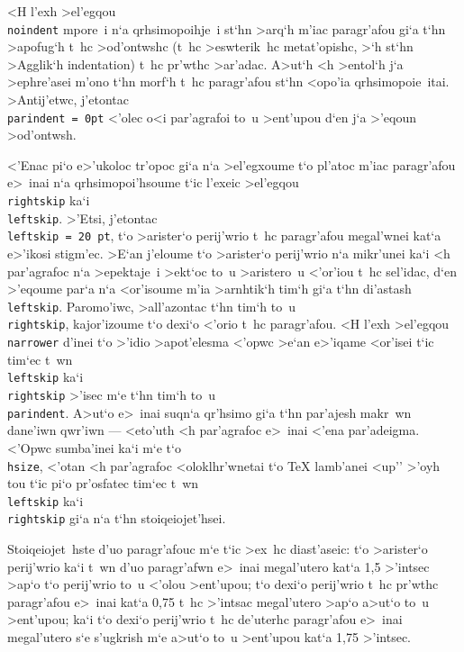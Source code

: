 <H l'exh >el'egqou {\tt \\noindent} mpore~i n`a qrhsimopoihje~i st`hn
>arq`h m'iac paragr'afou gi`a t`hn >apofug`h t~hc {\tengs >od'ontwshc}
(t~hc >eswterik~hc metat'opishc, >`h st`hn >Agglik`h {\rm indentation})
t~hc pr'wthc >ar'adac.  A>ut`h <h >entol`h j`a >ephre'asei m'ono t`hn
morf`h t~hc paragr'afou st`hn <opo'ia qrhsimopoie~itai.  >Antij'etwc,
j'etontac {\tt \\parindent = 0\NB{}pt} <'olec o<i par'agrafoi to~u
>ent'upou d`en j`a >'eqoun >od'ontwsh. 

{\narrower
<'Enac pi`o e>'ukoloc tr'opoc gi`a n`a >el'egxoume t`o pl'atoc m'iac
paragr'afou e>~inai n`a qrhsimopoi'hsoume t`ic l'exeic >el'egqou {\tt
\\rightskip} ka`i {\tt \\leftskip}.  >'Etsi, j'etontac {\tt \\leftskip =
20 pt}, t`o >arister`o perij'wrio t~hc paragr'afou megal'wnei kat`a
e>'ikosi stigm'ec.  >E`an j'eloume t`o >arister`o perij'wrio n`a 
mikr'unei ka`i <h par'agrafoc n`a >epe\-ktaje~i >ekt`oc to~u >aristero~u
<'or'iou t~hc sel'idac, d`en >'eqoume par`a n`a <or'isoume m'ia
>arnhtik`h tim`h gi`a t`hn di'astash {\tt \\leftskip}.  Paromo'iwc,
>all'azontac t`hn tim`h to~u {\tt \\rightskip}, kajor'izoume t`o dexi`o
<'orio t~hc paragr'afou.  <H l'exh >el'egqou {\tt \\narrower} d'inei t`o
>'idio >apot'elesma <'opwc >e`an e>'iqame <or'isei t`ic tim`ec t~wn {\tt
\\leftskip} ka`i {\tt \\rightskip} >'isec m`e t`hn tim`h to~u {\tt
\\parindent}.  A>ut`o e>~inai suqn`a qr'hsimo gi`a t`hn par'ajesh  
makr~wn dane'iwn qwr'iwn --- <eto'uth <h par'agrafoc e>~inai <'ena
par'adeigma.  <'Opwc sumba'inei ka`i m`e t`o {\tt \\hsize}, <'otan
<h par'agrafoc <oloklhr'wnetai t`o {\rm\TeX} lamb'anei <up'' >'oyh tou
t`ic pi`o pr'osfatec tim`ec t~wn {\tt\\leftskip} ka`i {\tt\\rightskip}
gi`a n`a t`hn stoiqeiojet'hsei.  \par
}

\exercise Stoiqeiojet~hste d'uo paragr'afouc m`e t`ic >ex~hc
diast'aseic: t`o >arister`o perij'wrio ka`i t~wn d'uo paragr'afwn
e>~inai megal'utero kat`a 1,5 >'intsec >ap`o t`o perij'wrio to~u <'olou
>ent'upou; t`o dexi`o perij'wrio t~hc pr'wthc paragr'afou e>~inai kat`a 
0,75 t~hc >'intsac megal'utero >ap`o a>ut`o to~u >ent'upou; ka`i t`o
dexi`o perij'wrio t~hc de'uterhc paragr'afou e>~inai megal'utero s`e
s'ugkrish m`e a>ut`o to~u >ent'upou kat`a 1,75 >'intsec.
\bigskip


